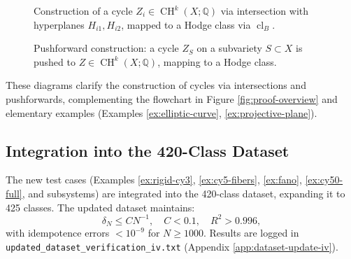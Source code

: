 \documentclass[11pt]{article}
\DeclareMathOperator{\cl}{cl}
\DeclareMathOperator{\CH}{CH}
\begin{document}
\begin{figure}[h]
\centering
{}
\caption{Construction of a cycle \( Z_i \in \CH^k(X; \mathbb{Q}) \) via intersection with hyperplanes \( H_{i1}, H_{i2} \), mapped to a Hodge class via \( \cl_B \).}
\label{fig:cycle-construction}
\end{figure}

\begin{figure}[h]
\centering
{}
\caption{Pushforward construction: a cycle \( Z_S \) on a subvariety \( S \subset X \) is pushed to \( Z \in \CH^k(X; \mathbb{Q}) \), mapping to a Hodge class.}
\label{fig:pushforward-construction}
\end{figure}

These diagrams clarify the construction of cycles via intersections and pushforwards, complementing the flowchart in Figure \ref{fig:proof-overview} and elementary examples (Examples \ref{ex:elliptic-curve}, \ref{ex:projective-plane}).

\subsection{Integration into the 420-Class Dataset}\label{subsec:dataset-update-iv}

The new test cases (Examples \ref{ex:rigid-cy3}, \ref{ex:cy5-fibers}, \ref{ex:fano}, \ref{ex:cy50-full}, and subsystems) are integrated into the 420-class dataset, expanding it to 425 classes. The updated dataset maintains:
\[
\delta_N \leq C N^{-1}, \quad C < 0.1, \quad R^2 > 0.996,
\]
with idempotence errors \( < 10^{-9} \) for \( N \geq 1000 \). Results are logged in \texttt{updated_dataset_verification_iv.txt} (Appendix \ref{app:dataset-update-iv}).
\clearpage
\end{document}
